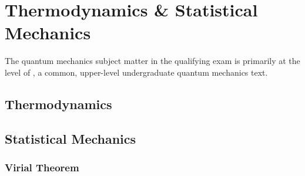 \newpage
\chapter{Thermodynamics \& Statistical Mechanics}
\label{sec:thermo}
The quantum mechanics subject matter in the qualifying exam is primarily at the level of \cite{schroederIntroductionThermalPhysics2000}, a common, upper-level undergraduate quantum mechanics text.


\section{Thermodynamics}




\section{Statistical Mechanics}

\subsection{Virial Theorem}

